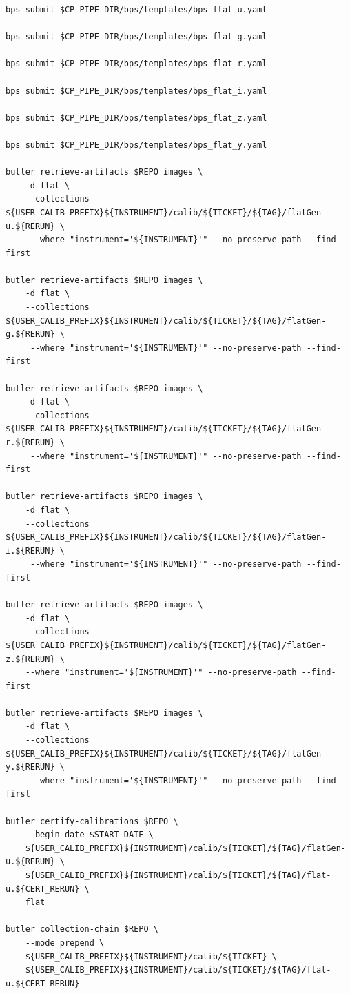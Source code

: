 \documentclass[DM,authoryear,toc]{lsstdoc}
\begin{document}
\begin{footnotesize}
\begin{verbatim}
bps submit $CP_PIPE_DIR/bps/templates/bps_flat_u.yaml

bps submit $CP_PIPE_DIR/bps/templates/bps_flat_g.yaml

bps submit $CP_PIPE_DIR/bps/templates/bps_flat_r.yaml

bps submit $CP_PIPE_DIR/bps/templates/bps_flat_i.yaml

bps submit $CP_PIPE_DIR/bps/templates/bps_flat_z.yaml

bps submit $CP_PIPE_DIR/bps/templates/bps_flat_y.yaml

butler retrieve-artifacts $REPO images \
    -d flat \
    --collections ${USER_CALIB_PREFIX}${INSTRUMENT}/calib/${TICKET}/${TAG}/flatGen-u.${RERUN} \
     --where "instrument='${INSTRUMENT}'" --no-preserve-path --find-first

butler retrieve-artifacts $REPO images \
    -d flat \
    --collections ${USER_CALIB_PREFIX}${INSTRUMENT}/calib/${TICKET}/${TAG}/flatGen-g.${RERUN} \
     --where "instrument='${INSTRUMENT}'" --no-preserve-path --find-first

butler retrieve-artifacts $REPO images \
    -d flat \
    --collections ${USER_CALIB_PREFIX}${INSTRUMENT}/calib/${TICKET}/${TAG}/flatGen-r.${RERUN} \
     --where "instrument='${INSTRUMENT}'" --no-preserve-path --find-first

butler retrieve-artifacts $REPO images \
    -d flat \
    --collections ${USER_CALIB_PREFIX}${INSTRUMENT}/calib/${TICKET}/${TAG}/flatGen-i.${RERUN} \
     --where "instrument='${INSTRUMENT}'" --no-preserve-path --find-first

butler retrieve-artifacts $REPO images \
    -d flat \
    --collections ${USER_CALIB_PREFIX}${INSTRUMENT}/calib/${TICKET}/${TAG}/flatGen-z.${RERUN} \
    --where "instrument='${INSTRUMENT}'" --no-preserve-path --find-first

butler retrieve-artifacts $REPO images \
    -d flat \
    --collections ${USER_CALIB_PREFIX}${INSTRUMENT}/calib/${TICKET}/${TAG}/flatGen-y.${RERUN} \
     --where "instrument='${INSTRUMENT}'" --no-preserve-path --find-first

butler certify-calibrations $REPO \
    --begin-date $START_DATE \
    ${USER_CALIB_PREFIX}${INSTRUMENT}/calib/${TICKET}/${TAG}/flatGen-u.${RERUN} \
    ${USER_CALIB_PREFIX}${INSTRUMENT}/calib/${TICKET}/${TAG}/flat-u.${CERT_RERUN} \
    flat

butler collection-chain $REPO \
    --mode prepend \
    ${USER_CALIB_PREFIX}${INSTRUMENT}/calib/${TICKET} \
    ${USER_CALIB_PREFIX}${INSTRUMENT}/calib/${TICKET}/${TAG}/flat-u.${CERT_RERUN}


\end{verbatim}
\end{footnotesize}
\end{document}
